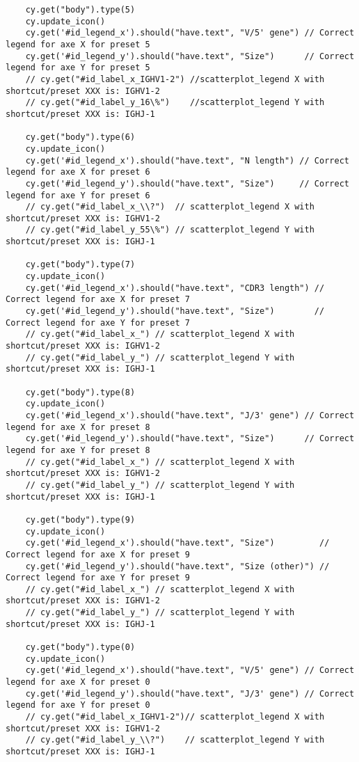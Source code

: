 \begin{verbatim}
    cy.get("body").type(5)
    cy.update_icon()
    cy.get('#id_legend_x').should("have.text", "V/5' gene") // Correct legend for axe X for preset 5
    cy.get('#id_legend_y').should("have.text", "Size")      // Correct legend for axe Y for preset 5
    // cy.get("#id_label_x_IGHV1-2") //scatterplot_legend X with shortcut/preset XXX is: IGHV1-2
    // cy.get("#id_label_y_16\%")    //scatterplot_legend Y with shortcut/preset XXX is: IGHJ-1

    cy.get("body").type(6)
    cy.update_icon()
    cy.get('#id_legend_x').should("have.text", "N length") // Correct legend for axe X for preset 6
    cy.get('#id_legend_y').should("have.text", "Size")     // Correct legend for axe Y for preset 6
    // cy.get("#id_label_x_\\?")  // scatterplot_legend X with shortcut/preset XXX is: IGHV1-2
    // cy.get("#id_label_y_55\%") // scatterplot_legend Y with shortcut/preset XXX is: IGHJ-1

    cy.get("body").type(7)
    cy.update_icon()
    cy.get('#id_legend_x').should("have.text", "CDR3 length") // Correct legend for axe X for preset 7
    cy.get('#id_legend_y').should("have.text", "Size")        // Correct legend for axe Y for preset 7
    // cy.get("#id_label_x_") // scatterplot_legend X with shortcut/preset XXX is: IGHV1-2
    // cy.get("#id_label_y_") // scatterplot_legend Y with shortcut/preset XXX is: IGHJ-1

    cy.get("body").type(8)
    cy.update_icon()
    cy.get('#id_legend_x').should("have.text", "J/3' gene") // Correct legend for axe X for preset 8
    cy.get('#id_legend_y').should("have.text", "Size")      // Correct legend for axe Y for preset 8
    // cy.get("#id_label_x_") // scatterplot_legend X with shortcut/preset XXX is: IGHV1-2
    // cy.get("#id_label_y_") // scatterplot_legend Y with shortcut/preset XXX is: IGHJ-1

    cy.get("body").type(9)
    cy.update_icon()
    cy.get('#id_legend_x').should("have.text", "Size")         // Correct legend for axe X for preset 9
    cy.get('#id_legend_y').should("have.text", "Size (other)") // Correct legend for axe Y for preset 9
    // cy.get("#id_label_x_") // scatterplot_legend X with shortcut/preset XXX is: IGHV1-2
    // cy.get("#id_label_y_") // scatterplot_legend Y with shortcut/preset XXX is: IGHJ-1

    cy.get("body").type(0)
    cy.update_icon()
    cy.get('#id_legend_x').should("have.text", "V/5' gene") // Correct legend for axe X for preset 0
    cy.get('#id_legend_y').should("have.text", "J/3' gene") // Correct legend for axe Y for preset 0
    // cy.get("#id_label_x_IGHV1-2")// scatterplot_legend X with shortcut/preset XXX is: IGHV1-2
    // cy.get("#id_label_y_\\?")    // scatterplot_legend Y with shortcut/preset XXX is: IGHJ-1

\end{verbatim}


